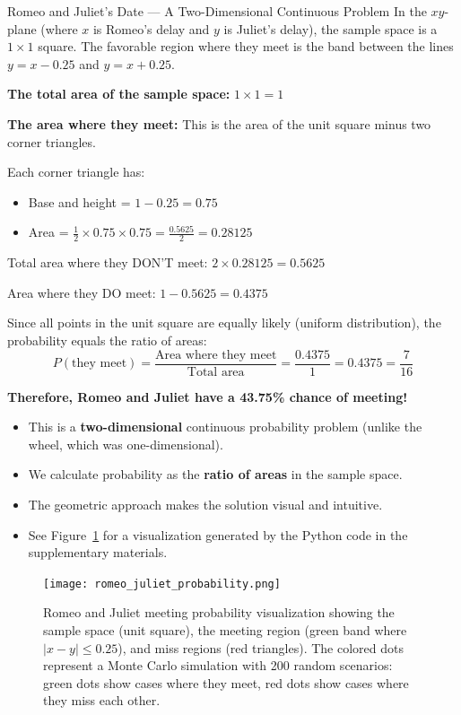 \begin{itemize}
\begin{exampleboxbreak}{Romeo and Juliet's Date — A Two-Dimensional Continuous Problem}
In the $xy$-plane (where $x$ is Romeo's delay and $y$ is Juliet's delay), the sample space is a $1 \times 1$ square. The favorable region where they meet is the band between the lines $y = x - 0.25$ and $y = x + 0.25$.

\textbf{The total area of the sample space:} $1 \times 1 = 1$

\textbf{The area where they meet:} This is the area of the unit square minus two corner triangles.

Each corner triangle has:
\begin{itemize}
    \item Base and height = $1 - 0.25 = 0.75$
    \item Area = $\frac{1}{2} \times 0.75 \times 0.75 = \frac{0.5625}{2} = 0.28125$
\end{itemize}

Total area where they DON'T meet: $2 \times 0.28125 = 0.5625$

Area where they DO meet: $1 - 0.5625 = 0.4375$


Since all points in the unit square are equally likely (uniform distribution), the probability equals the ratio of areas:
\[
P(\text{they meet}) = \frac{\text{Area where they meet}}{\text{Total area}} = \frac{0.4375}{1} = 0.4375 = \frac{7}{16}
\]

\textbf{Therefore, Romeo and Juliet have a 43.75\% chance of meeting!}


\begin{itemize}
    \item This is a \textbf{two-dimensional} continuous probability problem (unlike the wheel, which was one-dimensional).
    \item We calculate probability as the \textbf{ratio of areas} in the sample space.
    \item The geometric approach makes the solution visual and intuitive.
    \item See Figure~\ref{fig:romeo_juliet} for a visualization generated by the Python code in the supplementary materials.
\end{itemize}
\end{exampleboxbreak}

\begin{figure}[H]
    \centering
    \texttt{[image: romeo\_juliet\_probability.png]}
    \caption{Romeo and Juliet meeting probability visualization showing the sample space (unit square), the meeting region (green band where $|x-y| \leq 0.25$), and miss regions (red triangles). The colored dots represent a Monte Carlo simulation with 200 random scenarios: green dots show cases where they meet, red dots show cases where they miss each other.}
    \label{fig:romeo_juliet}
\end{figure}


\end{itemize}
